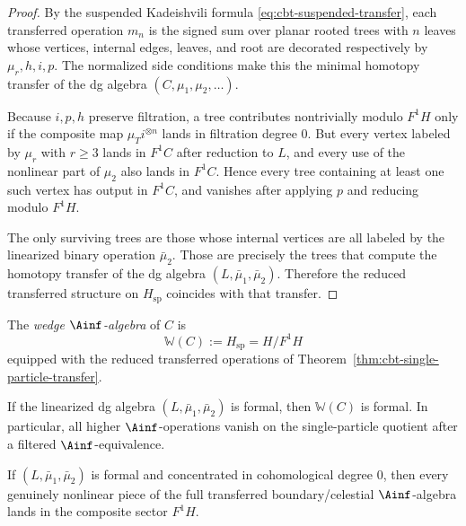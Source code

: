 \begin{proof}
By the suspended Kadeishvili formula
\eqref{eq:cbt-suspended-transfer}, each transferred operation \(m_n\)
is the signed sum over planar rooted trees with \(n\) leaves whose
vertices, internal edges, leaves, and root are decorated respectively
by \(\mu_r,h,i,p\).  The normalized side conditions make this the
minimal homotopy transfer of the dg algebra \((C,\mu_1,\mu_2,\ldots)\).

Because $i,p,h$ preserve filtration, a tree contributes nontrivially modulo $F^1H$ only if the composite map $\mu_T i^{\otimes n}$ lands in filtration degree $0$. But every vertex labeled by $\mu_r$ with $r\ge 3$ lands in $F^1C$ after reduction to $L$, and every use of the nonlinear part of $\mu_2$ also lands in $F^1C$. Hence every tree containing at least one such vertex has output in $F^1C$, and vanishes after applying $p$ and reducing modulo $F^1H$.

The only surviving trees are those whose internal vertices are all labeled by the linearized binary operation $\bar\mu_2$. Those are precisely the trees that compute the homotopy transfer of the dg algebra $(L,\bar\mu_1,\bar\mu_2)$. Therefore the reduced transferred structure on $H_{\mathrm{sp}}$ coincides with that transfer.
\end{proof}

\begin{definition}
\label{def:cbt-wedge-ainfty}
The \emph{wedge $\Ainf$-algebra} of $C$ is
\[
\mathbb{W}(C):=H_{\mathrm{sp}}=H/F^1H
\]
equipped with the reduced transferred operations of Theorem~\ref{thm:cbt-single-particle-transfer}.
\end{definition}

\begin{corollary}
\label{cor:cbt-single-particle-rigidity}
\ClaimStatusProvedHere
If the linearized dg algebra $(L,\bar\mu_1,\bar\mu_2)$ is formal, then $\mathbb{W}(C)$ is formal. In particular, all higher $\Ainf$-operations vanish on the single-particle quotient after a filtered $\Ainf$-equivalence.
\end{corollary}

\begin{corollary}
\label{cor:cbt-nonlinear-location}
\ClaimStatusProvedHere
If $(L,\bar\mu_1,\bar\mu_2)$ is formal and concentrated in cohomological degree $0$, then every genuinely nonlinear piece of the full transferred boundary/celestial $\Ainf$-algebra lands in the composite sector $F^1H$.
\end{corollary}

